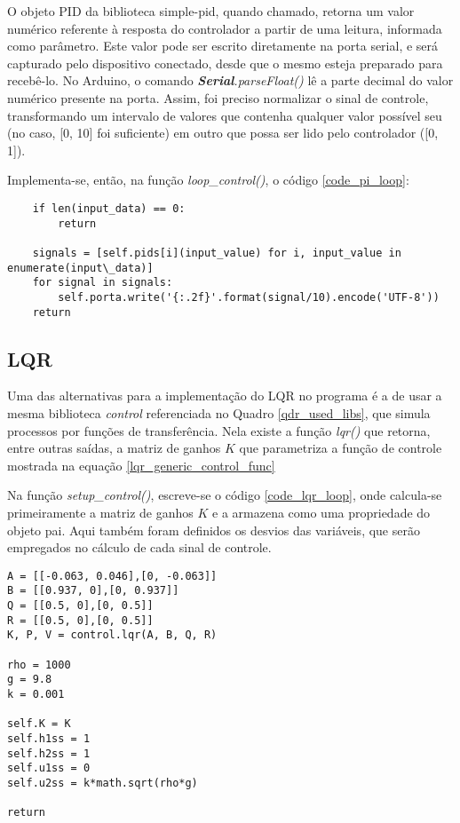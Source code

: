O objeto PID da biblioteca simple-pid, quando chamado, retorna um valor numérico referente à resposta do controlador a partir de uma leitura, informada como parâmetro. Este valor pode ser escrito diretamente na porta serial, e será capturado pelo dispositivo conectado, desde que o mesmo esteja preparado para recebê-lo. No Arduino, o comando \emph{\textbf{Serial}.parseFloat()} lê a parte decimal do valor numérico presente na porta. Assim, foi preciso normalizar o sinal de controle, transformando um intervalo de valores que contenha qualquer valor possível seu (no caso, [0, 10] foi suficiente) em outro que possa ser lido pelo controlador ([0, 1]).

Implementa-se, então, na função \emph{loop\_control()}, o código \ref{code_pi_loop}:

\begin{code}
\begin{lstlisting}
	if len(input_data) == 0:
		return

	signals = [self.pids[i](input_value) for i, input_value in enumerate(input\_data)]
	for signal in signals:
		self.porta.write('{:.2f}'.format(signal/10).encode('UTF-8'))
	return
\end{lstlisting}
\label{code_pi_loop}
\end{code}

\subsection{LQR}

Uma das alternativas para a implementação do LQR no programa é a de usar a mesma biblioteca \emph{control} referenciada no Quadro \ref{qdr_used_libs}, que simula processos por funções de transferência. Nela existe a função \emph{lqr()} que retorna, entre outras saídas, a matriz de ganhos $K$ que parametriza a função de controle mostrada na equação \ref{lqr_generic_control_func}

Na função \emph{setup\_control()}, escreve-se o código \ref{code_lqr_loop}, onde calcula-se primeiramente a matriz de ganhos $K$ e a armazena como uma propriedade do objeto pai. Aqui também foram definidos os desvios das variáveis, que serão empregados no cálculo de cada sinal de controle.

\begin{code}
\begin{lstlisting}
A = [[-0.063, 0.046],[0, -0.063]]
B = [[0.937, 0],[0, 0.937]]
Q = [[0.5, 0],[0, 0.5]]
R = [[0.5, 0],[0, 0.5]]
K, P, V = control.lqr(A, B, Q, R)

rho = 1000
g = 9.8
k = 0.001

self.K = K
self.h1ss = 1
self.h2ss = 1
self.u1ss = 0
self.u2ss = k*math.sqrt(rho*g)

return
\end{lstlisting}
\label{code_lqr_loop}
\end{code}

